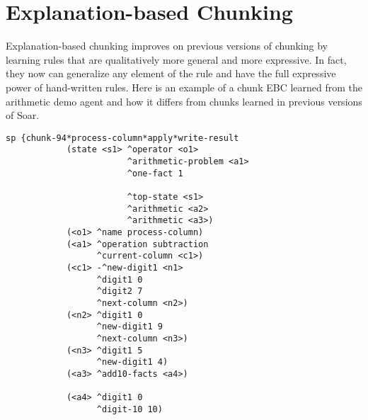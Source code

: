 \section{Explanation-based Chunking}

Explanation-based chunking improves on previous versions of chunking by learning rules that are qualitatively more general and more expressive.  In fact, they now can generalize any element of the rule and have the full expressive power of hand-written rules. Here is an example of a chunk EBC learned from the arithmetic demo agent and how it differs from chunks learned in previous versions of Soar.

\begin{table}
	\captionsetup{type=figure}
	\begin{multicols}{2}
	\begin{Verbatim}[fontsize=\tiny]
		sp {chunk-94*process-column*apply*write-result
		    (state <s1> ^operator <o1>
		                ^arithmetic-problem <a1>
		                ^one-fact 1
		
		                ^top-state <s1>
		                ^arithmetic <a2>
		                ^arithmetic <a3>)
		    (<o1> ^name process-column)
		    (<a1> ^operation subtraction
		          ^current-column <c1>)
		    (<c1> -^new-digit1 <n1>
		          ^digit1 0
		          ^digit2 7
		          ^next-column <n2>)
		    (<n2> ^digit1 0
		          ^new-digit1 9
		          ^next-column <n3>)
		    (<n3> ^digit1 5
		          ^new-digit1 4)
		    (<a3> ^add10-facts <a4>)
			
		    (<a4> ^digit1 0
		          ^digit-10 10)
		    

\end{Verbatim}
\end{multicols}
\end{table}
